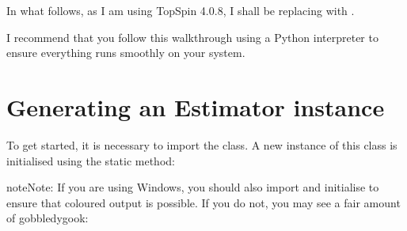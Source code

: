 \documentclass[letterpaper,10pt,english]{sphinxmanual}
\begin{document}
\sphinxAtStartPar
In what follows, as I am using TopSpin 4.0.8, I shall be replacing
 with .

\sphinxAtStartPar
I recommend that you follow this walkthrough using a Python
interpreter to ensure everything runs smoothly on your system.


\section{Generating an Estimator instance}
\label{\detokenize{walkthrough:generating-an-estimator-instance}}
\sphinxAtStartPar
To get started, it is necessary to import the {\hyperref[\detokenize{references/core:nmrespy.core.Estimator}]{}}
class. A new instance of this class is initialised using the static
{\hyperref[\detokenize{references/core:nmrespy.core.Estimator.new_bruker}]{}} method:

\begin{sphinxVerbatim}[commandchars=\\\{\}]
   
  
  
\end{sphinxVerbatim}

\begin{sphinxadmonition}{note}{Note:}
\sphinxAtStartPar
If you are using Windows, you should also import and initialise 
to ensure that coloured output is possible. If you do not, you may see a
fair amount of gobbledygook:

\begin{sphinxVerbatim}[commandchars=\\\{\}]
 
\end{sphinxVerbatim}
\end{sphinxadmonition}
\end{document}
